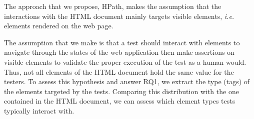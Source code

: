 
The approach that we propose, HPath, makes the assumption that the interactions with the HTML document mainly targets visible elements, \emph{i.e.} elements rendered on the web page. 

The assumption that we make is that a test should interact with elements to navigate through the states of the web application then make assertions on visible elements to validate the proper execution of the test as a human would. Thus, not all elements of the HTML document hold the same value for the testers. To assess this hypothesis and answer RQ1, we extract the type (tags) of the elements targeted by the tests. Comparing this distribution with the one contained in the HTML document, we can assess which element types tests typically interact with. 

